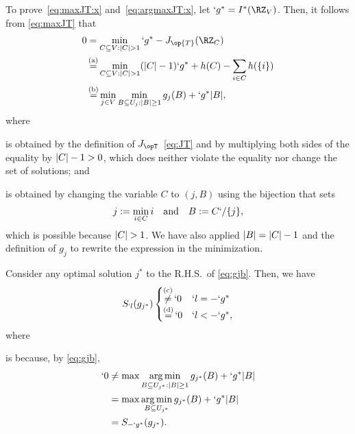 \begin{Proof}
	To prove~\eqref{eq:maxJT:x} and~\eqref{eq:argmaxJT:x}, let $`g^*=I^*(\RZ_V)$. Then, it follows from \eqref{eq:maxJT} that
		\begin{align}
			0&=\min_{C\subseteq V:\abs{C}>1}`g^*-J_{\op{T}}(\RZ_C) \nonumber \\
			&\utag{a}=\min_{C\subseteq V:\abs{C}>1}(\abs{C}-1)`g^*+h(C)-\sum_{i\in C}h(\Set{i}) \nonumber \\
			&\utag{b}=\min_{j\in V}\min_{B\subseteq U_j:\abs{B}\geq1} g_j(B)+`g^*\abs{B},
			\label{eq:gjb}
		\end{align}
	where
\begin{compactitem}
	\item {} is obtained by the definition of $J_{\opT}$~\eqref{eq:JT} and by multiplying both
		sides of the equality by $\abs{C}-1>0$, which does neither violate the equality nor change the
		set of solutions; and
	\item {} is obtained by changing the variable $C$ to $(j,B)$ using the bijection that sets
	\begin{align*}
		j:=\min_{i\in C} i
		\kern 1em \text {and}\kern1em B:=C`/\Set{j},
	\end{align*}
	which is possible because $\abs {C}>1$.
	We have also applied $\abs {B}=\abs {C}-1$ and the definition of $g_j$ to rewrite the expression in the minimization. %
\end{compactitem}
Consider any optimal solution $j^*$ to the R.H.S.\ of \eqref{eq:gjb}. Then, we have
\begin{align*}
	S_{`l}(g_{j^*}) 
	\begin{cases}
		\utag{c}\neq `0 & `l=-`g^*\\
		\utag{d}= `0 & `l<-`g^*,
	\end{cases}
\end{align*}
where
\begin{compactitem}
	\item {} is because, by \eqref{eq:gjb},
	\begin{align*}
		`0&\neq \max \argmin_{B\subseteq U_{j^*}:\abs{B}\geq 1} g_{j^*}(B)+`g^*\abs{B}\\
		&= \max \argmin_{B\subseteq U_{j^*}} g_{j^*}(B)+`g^*\abs{B}\\
		&=S_{-`g^*}(g_{j^*}).
	\end{align*}

\end{compactitem}
\end{Proof}
